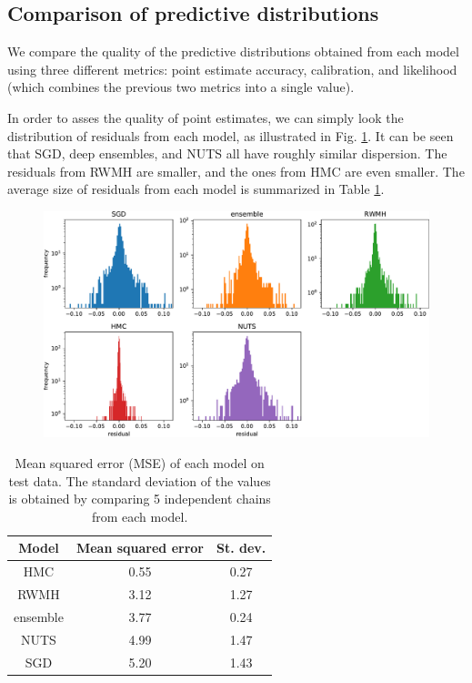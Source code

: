 \documentclass[12pt]{article}
\begin{document}
{\subsection{Comparison of predictive distributions}

We compare the quality of the predictive distributions obtained from each model using three different metrics: point estimate accuracy, calibration, and likelihood (which combines the previous two metrics into a single value).

In order to asses the quality of point estimates, we can simply look the distribution of residuals from each model, as illustrated in Fig. \ref{fig_uci_residuals_hist}. It can be seen that SGD, deep ensembles, and NUTS all have roughly similar dispersion. The residuals from RWMH are smaller, and the ones from HMC are even smaller. The average size of residuals from each model is summarized in Table \ref{table_uci_mse}.

\begin{figure}[H]
\centering
\includegraphics[width=15cm]{plots/uci_residuals_hist.pdf}
\caption{}
\label{fig_uci_residuals_hist}
\end{figure}

\begin{table}[H]
\centering
\begin{tabular}{|c|c|c|}
\hline
Model    & Mean squared error & St. dev. \\ \hline
HMC      & 0.55               & 0.27     \\ \hline
RWMH     & 3.12               & 1.27     \\ \hline
ensemble & 3.77               & 0.24     \\ \hline
NUTS     & 4.99               & 1.47     \\ \hline
SGD      & 5.20               & 1.43     \\ \hline
\end{tabular}
\caption{Mean squared error (MSE) of each model on test data. The standard deviation of the values is obtained by comparing 5 independent chains from each model.}
\label{table_uci_mse}
\end{table}

}
\end{document}
